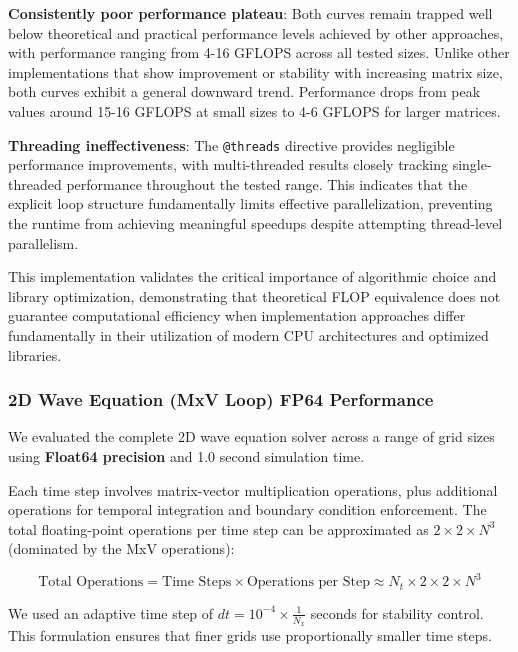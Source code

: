 \textbf{Consistently poor performance plateau}: Both curves remain trapped well below theoretical and practical performance levels achieved by other approaches, with performance ranging from 4-16 GFLOPS across all tested sizes. Unlike other implementations that show improvement or stability with increasing matrix size, both curves exhibit a general downward trend. Performance drops from peak values around 15-16 GFLOPS at small sizes to 4-6 GFLOPS for larger matrices.

\textbf{Threading ineffectiveness}: The \texttt{@threads} directive provides negligible performance improvements, with multi-threaded results closely tracking single-threaded performance throughout the tested range. This indicates that the explicit loop structure fundamentally limits effective parallelization, preventing the runtime from achieving meaningful speedups despite attempting thread-level parallelism.

This implementation validates the critical importance of algorithmic choice and library optimization, demonstrating that theoretical FLOP equivalence does not guarantee computational efficiency when implementation approaches differ fundamentally in their utilization of modern CPU architectures and optimized libraries.

\clearpage

\subsubsection*{2D Wave Equation (MxV Loop) FP64 Performance}

We evaluated the complete 2D wave equation solver across a range of grid sizes using \textbf{Float64 precision} and 1.0 second simulation time.

Each time step involves matrix-vector multiplication operations, plus additional operations for temporal integration and boundary condition enforcement. The total floating-point operations per time step can be approximated as $2 \times 2 \times N^3$ (dominated by the MxV operations):

\begin{equation}
\text{Total Operations} = \text{Time Steps} \times \text{Operations per Step} \approx N_t \times 2 \times 2 \times N^3
\end{equation}

We used an adaptive time step of $dt = 10^{-4} \times \frac{1}{N_{x}}$ seconds for stability control. This formulation ensures that finer grids use proportionally smaller time steps.

